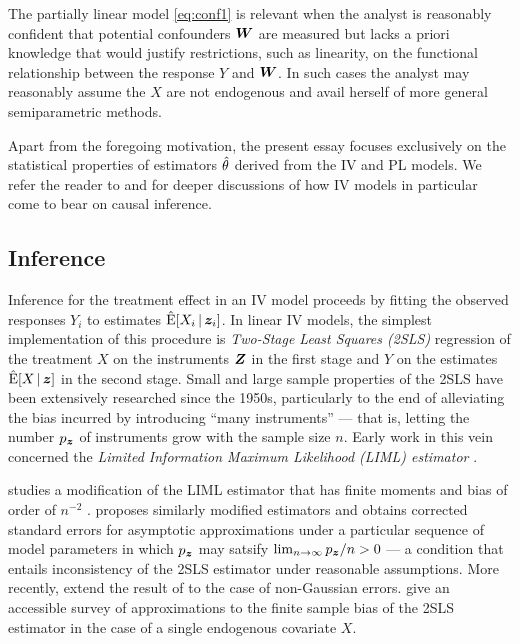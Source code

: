 \documentclass{uwstat572}
\theoremstyle{definition}
\theoremstyle{remark}
\newcommand{\E}{\mathrm{E}}
\newcommand{\Ehat}{\hat{\E}}
\numberwithin{equation}{section}
\begin{document}
The partially linear model \ref{eq:conf1} is relevant when the analyst is reasonably confident that potential confounders $\boldsymbol{W}$ are measured but lacks a priori knowledge that would justify restrictions, such as linearity, on the functional relationship between the response $Y$ and $\boldsymbol{W}$. In such cases the analyst may reasonably assume the $X$ are not endogenous and avail herself of more general semiparametric methods.

Apart from the foregoing motivation, the present essay focuses exclusively on the statistical properties of estimators $\hat{\theta}$ derived from the IV and PL models. We refer the reader to \cite[Chapter 5]{P09} and \cite{AK01} for deeper discussions of how IV models in particular come to bear on causal inference. 



%

\subsection{Inference}\label{ss:inf}

Inference for the treatment effect in an IV model proceeds by fitting the observed responses $Y_i$ to estimates $\Ehat[X_i\,|\,\z_i]$. In linear IV models, the simplest implementation of this procedure is \emph{Two-Stage Least Squares (2SLS)} regression of the treatment $X$ on the instruments $\boldsymbol{Z}$ in the first stage and $Y$ on the estimates $\Ehat[X\,|\,\z]$ in the second stage. Small and large sample properties of the 2SLS have been extensively researched since the 1950s, particularly to the end of alleviating the bias incurred by introducing ``many instruments'' --- that is, letting the number ${p_{\boldsymbol{z}}}$ of instruments grow with the sample size $n$. Early work in this vein concerned the \emph{Limited Information Maximum Likelihood (LIML) estimator} . 

\cite{F77} studies a modification of the LIML estimator that has finite moments and bias of order of $n^{-2}$ . \cite{B94} proposes similarly modified estimators and obtains corrected standard errors for asymptotic approximations under a particular sequence of model parameters in which ${p_{\boldsymbol{z}}}$ may satsify $\lim_{n\to\infty} {p_{\boldsymbol{z}}}/n > 0$ --- a condition that entails inconsistency of the 2SLS estimator under reasonable assumptions. More recently, \cite{HHN08} extend the result of \cite{B94} to the case of non-Gaussian errors. \cite{BW11} give an accessible survey of approximations to the finite sample bias of the 2SLS estimator in the case of a single endogenous covariate $X$. 
\end{document}
